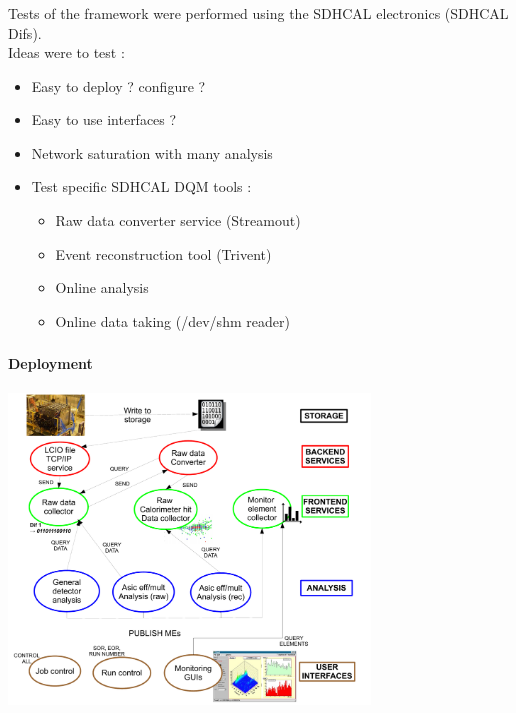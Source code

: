 \documentclass[8pt]{beamer}
\begin{document}
  \begin{frame}
  \frametitle{\secname}

  Tests of the framework were performed using the SDHCAL electronics (SDHCAL Difs). \\
  Ideas were to test : \\
  
  \begin{itemize}
    \item Easy to deploy ? configure ?
    \item Easy to use interfaces ?
    \item Network saturation with many analysis
    \item Test specific SDHCAL DQM tools :
    \begin{itemize}
      \item Raw data converter service (Streamout)
      \item Event reconstruction tool (Trivent)
      \item Online analysis
      \item Online data taking (/dev/shm reader)
    \end{itemize}
  \end{itemize}
  
  \end{frame}
  
  
  \begin{frame}
  \frametitle{\secname}
  \framesubtitle{Deployment}
  
  \centering \includegraphics[width=0.72\textwidth]{figs/DQM4HEP_DEPLOYEMENT_TEST.pdf}
  
  \end{frame}
  
\end{document}
